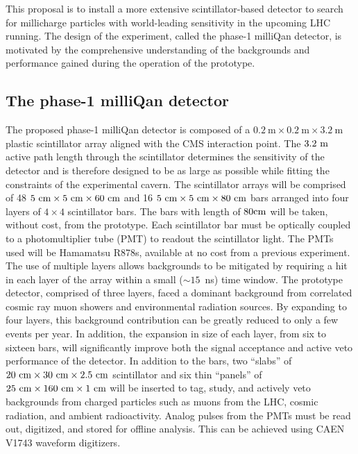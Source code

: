 \documentclass[11pt]{article}
\theoremstyle{plain} \numberwithin{equation}{section}
\theoremstyle{definition}
\begin{document}
This proposal is to install a more extensive scintillator-based detector
to search for millicharge particles with world-leading sensitivity in the upcoming LHC running.
The design of the experiment, called the phase-1 milliQan detector, is motivated by 
the comprehensive understanding of the backgrounds and performance gained during the
operation of the prototype.

\subsection*{The phase-1 milliQan detector}

The proposed phase-1 milliQan detector is
composed of a $0.2~\mathrm{m}\times0.2~\mathrm{m}\times3.2~\mathrm{m}$ plastic scintillator array aligned with 
the CMS interaction point. The $3.2~\rm{m}$ active path length through the scintillator determines the sensitivity 
of the detector and is therefore designed to be as large as possible while fitting the constraints of the experimental cavern.
The scintillator arrays will be comprised of 48 $5~\rm{cm}\times5~\rm{cm}\times60~\rm{cm}$ 
and 16 $5~\rm{cm}\times5~\rm{cm}\times80~\rm{cm}$ bars arranged into four layers of $4\times4$ scintillator bars. 
The bars with length of $80\rm{cm}$ will be taken, without cost, from the prototype. Each scintillator bar must be optically
coupled to a photomultiplier tube (PMT) to readout the scintillator light. The PMTs used will be 
Hamamatsu R878s, available at no cost from a previous experiment. The use of multiple layers allows backgrounds to be mitigated
by requiring a hit in each layer of the array within a small ($\sim 15$~ns) time window. The prototype detector, comprised
of three layers, faced a dominant background from correlated cosmic ray muon showers and environmental radiation sources.
By expanding to four layers, this background contribution can be greatly reduced to only a few events per year.
In addition, the expansion in size of each layer, from six to sixteen bars, will significantly improve
both the signal acceptance and active veto performance of the detector. 
In addition to the bars, two ``slabs'' of $20~\rm{cm}\times30~\rm{cm}\times2.5~\rm{cm}$ scintillator and 
six thin ``panels'' of $25~\rm{cm}\times160~\rm{cm}\times1~\rm{cm}$ 
will be inserted to tag, study, and actively veto backgrounds from charged particles such as muons from the LHC, cosmic radiation, and ambient radioactivity.
Analog pulses from the PMTs must be read out,
digitized, and stored for offline analysis. This can be achieved using CAEN V1743 waveform digitizers. 
\end{document}
